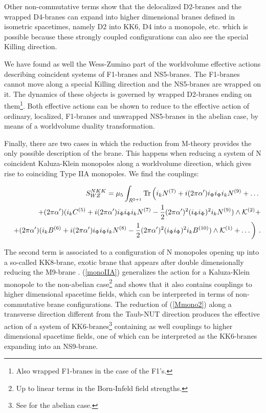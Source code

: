 \documentclass[12pt,a4paper]{article}
\begin{document}
Other non-commutative terms show that the delocalized
D2-branes and the wrapped D4-branes can expand into higher dimensional
branes defined in isometric spacetimes, namely D2 into KK6, D4 into
a monopole, etc. which is possible because these strongly coupled
configurations can also see the special Killing direction.

We have found as well the Wess-Zumino part of the worldvolume 
effective actions describing
coincident systems of F1-branes and NS5-branes. The F1-branes
cannot move along a special Killing direction and the NS5-branes
are wrapped on it. The dynamics of these objects is governed by
wrapped D2-branes ending on them\footnote{Also wrapped F1-branes in the
case of the F1's.}. Both effective actions can be shown to reduce
to the effective action of ordinary, localized, F1-branes and
unwrapped NS5-branes in the abelian case, by means of a worldvolume
duality transformation. 


Finally, there are two cases in which the reduction from M-theory
provides the only possible description of the brane. This
happens when reducing a system of N coincident Kaluza-Klein
monopoles along a worldvolume direction, which
gives rise to coinciding Type IIA monopoles. We find the couplings:

\begin{eqnarray}
\label{monoIIA}
&&S^{NKK}_{WZ}=\mu_5\int_{R^{5+1}}{\rm Tr}\left( i_k N^{(7)}+
i(2\pi\alpha^\prime)i_\Phi i_\Phi i_k N^{(9)}+\dots\right.\nonumber\\
&&+(2\pi\alpha^\prime)(i_k C^{(5)}+i(2\pi\alpha^\prime)
i_\Phi i_\Phi i_k N^{(7)}-\frac12 (2\pi\alpha^\prime)^2
(i_\Phi i_\Phi)^2 i_k N^{(9)})\wedge {\cal K}^{(2)}+\nonumber\\
&&\left. +(2\pi\alpha^\prime)(i_k B^{(6)}+i(2\pi\alpha^\prime)
i_\Phi i_\Phi i_k N^{(8)}-\frac12 (2\pi\alpha^\prime)^2
(i_\Phi i_\Phi)^2 i_k B^{(10)})\wedge {\cal K}^{(1)}
+\dots\right)\, .
\end{eqnarray}

\noindent The second term is associated to a configuration of N 
monopoles opening up into a so-called KK8-brane, exotic brane that
appears after double dimensionally reducing the
M9-brane \cite{HMO,EL}. (\ref{monoIIA}) generalizes the action for a
Kaluza-Klein monopole \cite{BEL} to the non-abelian 
case\footnote{Up to linear
terms in the Born-Infeld field strengths.} and shows that it also
contains couplings to higher dimensional spacetime fields, 
which can be interpreted in terms of
non-commutative brane configurations. 
The reduction of (\ref{Mmono2}) along a transverse direction 
different from the Taub-NUT direction produces the effective action
of a system of KK6-branes\footnote{See \cite{EL} for the abelian
case.} containing as well couplings to higher dimensional
spacetime fields, one of which can be interpreted as the KK6-branes
expanding into an NS9-brane.
\end{document}
